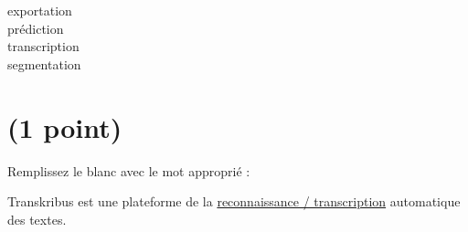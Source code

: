 \documentclass[UKenglish]{uioexam}
\begin{document}
\begin{choicelist}[]
   \makebox[0pt][l]{$\square$} exportation\\

    \makebox[0pt][l]{$\square$}
    prédiction\\

    \makebox[0pt][l]{$\square$}
    transcription\\

   \makebox[0pt][l]{$\square$}\raisebox{0.15ex}{\hspace{0.1em}$\checkmark$} segmentation\\

\end{choicelist}


\section[Transkribus]{\small(1 point)}
Remplissez le blanc avec le mot approprié :

Transkribus est une plateforme de la \underline{reconnaissance / transcription} automatique des textes.
\end{document}

